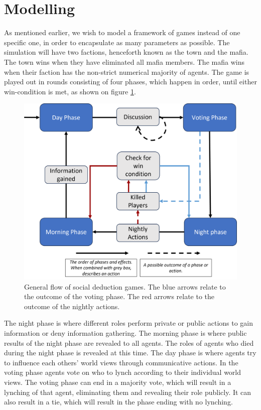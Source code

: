 \section{Modelling} \label{sec:Modelling}
As mentioned earlier, we wish to model a framework of games instead of one
specific one, in order to encapsulate as many parameters as possible. The
simulation will have two factions, henceforth known as the town and the mafia.
The town wins when they have eliminated all mafia members. The mafia wins when
their faction has the non-strict numerical majority of agents. The game is
played out in rounds consisting of four phases, which happen in order, until
either win-condition is met, as shown on figure \ref{fig:GameOverview}.
\begin{figure}[H]
	\includegraphics[width=1\linewidth]{figures/Game_overview3}
	\caption{General flow of social deduction games. The blue arrows relate to the outcome of the voting phase. The red arrows relate to the outcome of the nightly actions.}
	\label{fig:GameOverview}
\end{figure}

The night phase is where different roles perform private or public actions to
gain information or deny information gathering. The morning phase is where
public results of the night phase are revealed to all agents. The roles of
agents who died during the night phase is revealed at this time. The day phase
is where agents try to influence each others' world views through communicative
actions. In the voting phase agents vote on who to lynch according to their
individual world views. The voting phase can end in a majority vote, which will
result in a lynching of that agent, eliminating them and revealing their role
publicly. It can also result in a tie, which will result in the phase ending
with no lynching.

